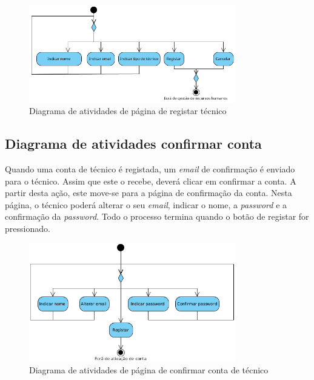 \begin{figure}[htb]
  \centering
  \includegraphics[width=0.8\textwidth]{images/diagramas/atividades/diagrama_atividades_add_professional.png}
  \caption{Diagrama de atividades de página de registar técnico}
  \label{fig:31}
\end{figure}

\subsection{Diagrama de atividades confirmar conta}

Quando uma conta de técnico é registada, um \textit{email} de confirmação é enviado para o técnico. Assim que este o recebe, deverá clicar em confirmar a conta. A partir desta ação, este move-se para a página de confirmação da conta. Nesta página, o técnico poderá alterar o seu \textit{email}, indicar o nome, a \textit{password} e a confirmação da \textit{password}. Todo o processo termina quando o botão de registar for pressionado.

\begin{figure}[htb]
  \centering
  \includegraphics[width=0.8\textwidth]{images/diagramas/atividades/diagrama_atividades_prof_register.png}
  \caption{Diagrama de atividades de página de confirmar conta de técnico}
  \label{fig:31}
\end{figure}